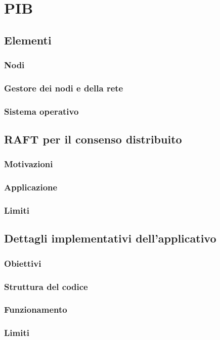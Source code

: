 
\section{PIB}
\subsection{Elementi}
\subsubsection{Nodi}

\subsubsection{Gestore dei nodi e della rete}

\subsubsection{Sistema operativo}

\subsection{RAFT per il consenso distribuito}
\subsubsection{Motivazioni}

\subsubsection{Applicazione}

\subsubsection{Limiti}

\subsection{Dettagli implementativi dell'applicativo}
\subsubsection{Obiettivi}

\subsubsection{Struttura del codice}

\subsubsection{Funzionamento}

\subsubsection{Limiti}
